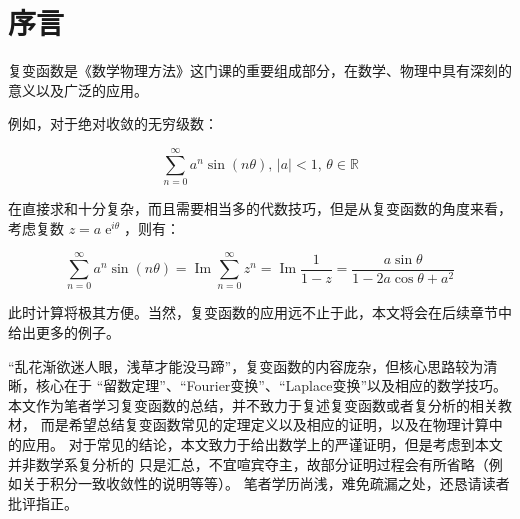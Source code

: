 \chapter{序言}

复变函数是《数学物理方法》这门课的重要组成部分，在数学、物理中具有深刻的意义以及广泛的应用。

{\kaishu
例如，对于绝对收敛的无穷级数：

\begin{equation}
    \sum_{n=0}^{\infty} a^n\operatorname{sin}(n\theta),\, |a|<1,\, \theta\in\mathbb{R}
\end{equation}

在直接求和十分复杂，而且需要相当多的代数技巧，但是从复变函数的角度来看，考虑复数 
$z = a\operatorname{e}^{i\theta}$，则有：

\begin{equation}
    \sum_{n=0}^{\infty} a^n\operatorname{sin}(n\theta)= \operatorname{Im}\sum_{n=0}^{\infty} z^n = \operatorname{Im}\frac{1}{1-z} = \frac{a\operatorname{sin}\theta}{1-2a\operatorname{cos}\theta+a^2}
\end{equation}

}

此时计算将极其方便。当然，复变函数的应用远不止于此，本文将会在后续章节中给出更多的例子。


“乱花渐欲迷人眼，浅草才能没马蹄”，复变函数的内容庞杂，但核心思路较为清晰，核心在于
“留数定理”、“Fourier变换”、“Laplace变换”以及相应的数学技巧。
本文作为笔者学习复变函数的总结，并不致力于复述复变函数或者复分析的相关教材，
而是希望总结复变函数常见的定理定义以及相应的证明，以及在物理计算中的应用。
对于常见的结论，本文致力于给出数学上的严谨证明，但是考虑到本文并非数学系复分析的
只是汇总，不宜喧宾夺主，故部分证明过程会有所省略（例如关于积分一致收敛性的说明等等）。
笔者学历尚浅，难免疏漏之处，还恳请读者批评指正。

